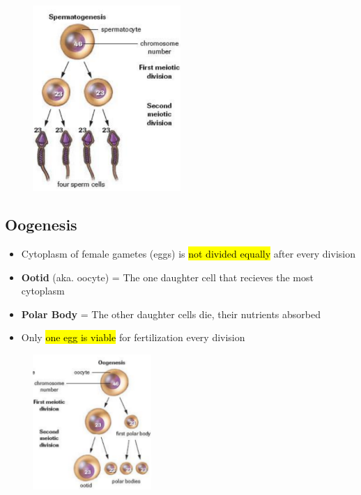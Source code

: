 \documentclass[a4paper,12pt]{article}
\begin{document}
\begin{figure}[H]
    \centering
    \includegraphics[width=0.5\textwidth]{spermatogenesis}
\end{figure}

\subsection{Oogenesis}
\begin{itemize}
    \item{Cytoplasm of female gametes (eggs) is \hl{not divided equally} after every division}
    \item{\textbf{Ootid} (aka. oocyte) = The one daughter cell that recieves the most cytoplasm}
    \item{\textbf{Polar Body} = The other daughter cells die, their nutrients absorbed}
    \item{Only \hl{one egg is viable} for fertilization every division}
\end{itemize}

\begin{figure}[H]
    \centering
    \includegraphics[width=0.4\textwidth]{oogenesis}
\end{figure}
\end{document}
